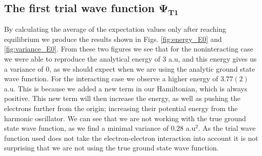 \documentclass[%
 reprint,
nofootinbib,
aps,
]{revtex4-1}
\begin{document}
\subsection{The first trial wave function $\boldsymbol{\Psi_{T1}}$}

By calculating the average of the expectation values only after reaching equilibrium we produce the results shown in Figs. \ref{fig:energy_E0} and \vref{fig:variance_E0}.
From these two figures we see that for the noninteracting case we were able to reproduce the analytical energy of $3$ a.u, and this energy gives us a variance of $0$, as we should expect when we are using the analytic ground state wave function. For the interacting case we observe a higher energy of $3.77(2)$ a.u. This is because we added a new term in our Hamiltonian, which is always positive. This new term will then increase the energy, as well as pushing the electrons further from the origin; increasing their potential energy from the harmonic oscillator. We can see that we are not working with the true ground state wave function, as we find a minimal variance of $0.28$ a.u$^2$. As the trial wave function used does not take the electron-electron interaction into account it is not surprising that we are not using the true ground state wave function.
\end{document}
